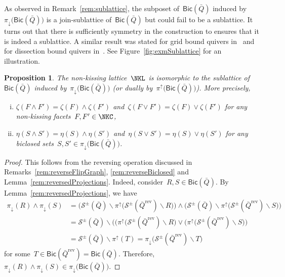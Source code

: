 \documentclass{memo-l}
\newtheorem{proposition}[theorem]{Proposition}
\theoremstyle{definition}
\newcommand{\ssm}{\smallsetminus} %
\newcommand{\fref}[1]{Figure~\ref{#1}} %
\newcommand{\strings}{\mathcal{S}} %
\newcommand{\reversed}[1]{#1^{\mathrm{rev}}} %
\newcommand{\meet}{\wedge} %
\newcommand{\join}{\vee} %
\newcommand{\Bicl}[1]{\mathsf{Bic}(#1)} %
\newcommand{\projDown}{\pi_\downarrow} %
\newcommand{\projUp}{\pi^\uparrow} %
\begin{document}
As observed in Remark~\ref{rem:sublattice}, the subposet of~$\Bicl{\bar Q}$ induced by~$\projDown \big( \Bicl{\bar Q} \big)$ is a join-sublattice of~$\Bicl{\bar Q}$ but could fail to be a sublattice.
It turns out that there is sufficiently symmetry in the construction to ensures that it is indeed a sublattice.
A similar result was stated for grid bound quivers in~\cite[Lem.~4.5]{GarverMcConville-grid} and for dissection bound quivers in~\cite[Thm.~4.11]{GarverMcConville}.
See \fref{fig:exmSublattice} for an illustration.

\begin{proposition}
\label{prop:sublattice}
The non-kissing lattice~$\NKL$ is isomorphic to the sublattice of~$\Bicl{\bar Q}$ induced by~$\projDown \big( \Bicl{\bar Q} \big)$ (or dually by~$\projUp \big( \Bicl{\bar Q} \big)$). More precisely,
\begin{enumerate}[(i)]
\item $\zeta(F \meet F') = \zeta(F) \meet \zeta(F')$ and~$\zeta(F \join F') = \zeta(F) \join \zeta(F')$ for any non-kissing facets~${F, F' \in \NKC}$,
\item $\eta(S \meet S') = \eta(S) \meet \eta(S')$ and~$\eta(S \join S') = \eta(S) \join \eta(S')$ for any biclosed sets~$S, S' \in \projDown \big( \Bicl{\bar Q} \big)$.
\end{enumerate}
\end{proposition}

\begin{proof}
This follows from the reversing operation discussed in Remarks~\ref{rem:reverseFlipGraph}, \ref{rem:reverseBiclosed} and Lemma~\ref{rem:reversedProjections}.
Indeed, consider~$R, S \in \Bicl{\bar Q}$.
By Lemma~\ref{rem:reversedProjections}, we have
\begin{align*}
\projDown(R) \meet \projDown(S) 
& = \big( \strings^\pm(\bar Q) \ssm \projUp\big( \strings^\pm(\reversed{\bar Q}) \ssm R \big) \big) \meet \big( \strings^\pm(\bar Q) \ssm \projUp\big( \strings^\pm(\reversed{\bar Q}) \ssm S \big) \big) \\
& = \strings^\pm(\bar Q) \ssm \big(  \big( \projUp\big( \strings^\pm(\reversed{\bar Q}) \ssm R \big) \join \big( \projUp\big( \strings^\pm(\reversed{\bar Q}) \ssm S \big) \big) \\
& = \strings^\pm(\bar Q) \ssm \projUp(T) = \projDown\big( \strings^\pm(\reversed{\bar Q}) \ssm T \big)
\end{align*}
for some~$T \in \Bicl{\reversed{\bar Q}} = \Bicl{\bar Q}$.
Therefore, $\projDown(R) \meet \projDown(S) \in \projDown \big( \Bicl{\bar Q} \big)$.
\end{proof}
\end{document}
